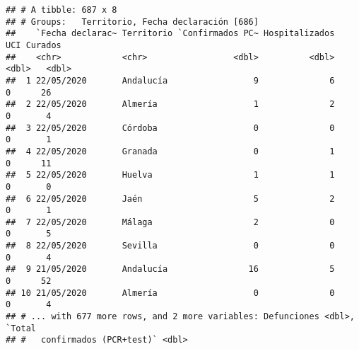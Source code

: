 \documentclass[
]{book}
\begin{document}
\begin{verbatim}
## # A tibble: 687 x 8
## # Groups:   Territorio, Fecha declaración [686]
##    `Fecha declarac~ Territorio `Confirmados PC~ Hospitalizados   UCI Curados
##    <chr>            <chr>                 <dbl>          <dbl> <dbl>   <dbl>
##  1 22/05/2020       Andalucía                 9              6     0      26
##  2 22/05/2020       Almería                   1              2     0       4
##  3 22/05/2020       Córdoba                   0              0     0       1
##  4 22/05/2020       Granada                   0              1     0      11
##  5 22/05/2020       Huelva                    1              1     0       0
##  6 22/05/2020       Jaén                      5              2     0       1
##  7 22/05/2020       Málaga                    2              0     0       5
##  8 22/05/2020       Sevilla                   0              0     0       4
##  9 21/05/2020       Andalucía                16              5     0      52
## 10 21/05/2020       Almería                   0              0     0       4
## # ... with 677 more rows, and 2 more variables: Defunciones <dbl>, `Total
## #   confirmados (PCR+test)` <dbl>
\end{verbatim}
\end{document}

